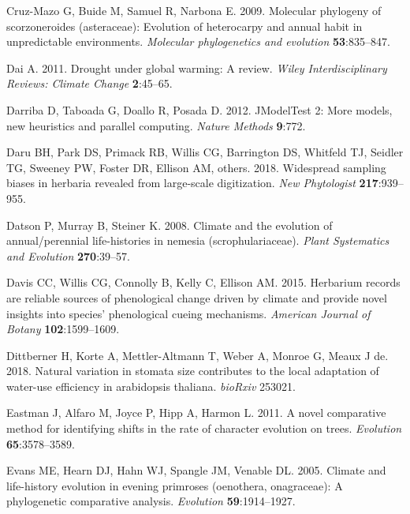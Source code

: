 \documentclass[man,floatsintext]{apa6}
\theoremstyle{definition}
\theoremstyle{definition}
\theoremstyle{definition}
\theoremstyle{remark}
\begin{document}
\leavevmode\hypertarget{ref-cruz2009molecular}{}%
Cruz-Mazo G, Buide M, Samuel R, Narbona E. 2009. Molecular phylogeny of
scorzoneroides (asteraceae): Evolution of heterocarpy and annual habit
in unpredictable environments. \emph{Molecular phylogenetics and
evolution} \textbf{53}:835--847.

\leavevmode\hypertarget{ref-dai2011drought}{}%
Dai A. 2011. Drought under global warming: A review. \emph{Wiley
Interdisciplinary Reviews: Climate Change} \textbf{2}:45--65.

\leavevmode\hypertarget{ref-darriba2012jmodeltest}{}%
Darriba D, Taboada G, Doallo R, Posada D. 2012. JModelTest 2: More
models, new heuristics and parallel computing. \emph{Nature Methods}
\textbf{9}:772.

\leavevmode\hypertarget{ref-daru2018widespread}{}%
Daru BH, Park DS, Primack RB, Willis CG, Barrington DS, Whitfeld TJ,
Seidler TG, Sweeney PW, Foster DR, Ellison AM, others. 2018. Widespread
sampling biases in herbaria revealed from large-scale digitization.
\emph{New Phytologist} \textbf{217}:939--955.

\leavevmode\hypertarget{ref-datson2008climate}{}%
Datson P, Murray B, Steiner K. 2008. Climate and the evolution of
annual/perennial life-histories in nemesia (scrophulariaceae).
\emph{Plant Systematics and Evolution} \textbf{270}:39--57.

\leavevmode\hypertarget{ref-davis2015herbarium}{}%
Davis CC, Willis CG, Connolly B, Kelly C, Ellison AM. 2015. Herbarium
records are reliable sources of phenological change driven by climate
and provide novel insights into species' phenological cueing mechanisms.
\emph{American Journal of Botany} \textbf{102}:1599--1609.

\leavevmode\hypertarget{ref-dittberner2018natural}{}%
Dittberner H, Korte A, Mettler-Altmann T, Weber A, Monroe G, Meaux J de.
2018. Natural variation in stomata size contributes to the local
adaptation of water-use efficiency in arabidopsis thaliana.
\emph{bioRxiv} 253021.

\leavevmode\hypertarget{ref-R-geiger_b}{}%
Eastman J, Alfaro M, Joyce P, Hipp A, Harmon L. 2011. A novel
comparative method for identifying shifts in the rate of character
evolution on trees. \emph{Evolution} \textbf{65}:3578--3589.

\leavevmode\hypertarget{ref-evans2005climate}{}%
Evans ME, Hearn DJ, Hahn WJ, Spangle JM, Venable DL. 2005. Climate and
life-history evolution in evening primroses (oenothera, onagraceae): A
phylogenetic comparative analysis. \emph{Evolution}
\textbf{59}:1914--1927.
\end{document}
